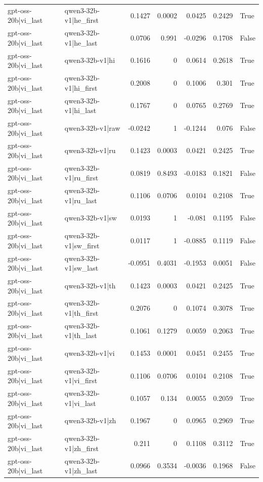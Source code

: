 \begin{table}
\begin{tabular}{l l r r r r l}
gpt-oss-20b|vi_last & qwen3-32b-v1|he_first & 0.1427 & 0.0002 & 0.0425 & 0.2429 & True \\
gpt-oss-20b|vi_last & qwen3-32b-v1|he_last & 0.0706 & 0.991 & -0.0296 & 0.1708 & False \\
gpt-oss-20b|vi_last & qwen3-32b-v1|hi & 0.1616 & 0 & 0.0614 & 0.2618 & True \\
gpt-oss-20b|vi_last & qwen3-32b-v1|hi_first & 0.2008 & 0 & 0.1006 & 0.301 & True \\
gpt-oss-20b|vi_last & qwen3-32b-v1|hi_last & 0.1767 & 0 & 0.0765 & 0.2769 & True \\
gpt-oss-20b|vi_last & qwen3-32b-v1|raw & -0.0242 & 1 & -0.1244 & 0.076 & False \\
gpt-oss-20b|vi_last & qwen3-32b-v1|ru & 0.1423 & 0.0003 & 0.0421 & 0.2425 & True \\
gpt-oss-20b|vi_last & qwen3-32b-v1|ru_first & 0.0819 & 0.8493 & -0.0183 & 0.1821 & False \\
gpt-oss-20b|vi_last & qwen3-32b-v1|ru_last & 0.1106 & 0.0706 & 0.0104 & 0.2108 & True \\
gpt-oss-20b|vi_last & qwen3-32b-v1|sw & 0.0193 & 1 & -0.081 & 0.1195 & False \\
gpt-oss-20b|vi_last & qwen3-32b-v1|sw_first & 0.0117 & 1 & -0.0885 & 0.1119 & False \\
gpt-oss-20b|vi_last & qwen3-32b-v1|sw_last & -0.0951 & 0.4031 & -0.1953 & 0.0051 & False \\
gpt-oss-20b|vi_last & qwen3-32b-v1|th & 0.1423 & 0.0003 & 0.0421 & 0.2425 & True \\
gpt-oss-20b|vi_last & qwen3-32b-v1|th_first & 0.2076 & 0 & 0.1074 & 0.3078 & True \\
gpt-oss-20b|vi_last & qwen3-32b-v1|th_last & 0.1061 & 0.1279 & 0.0059 & 0.2063 & True \\
gpt-oss-20b|vi_last & qwen3-32b-v1|vi & 0.1453 & 0.0001 & 0.0451 & 0.2455 & True \\
gpt-oss-20b|vi_last & qwen3-32b-v1|vi_first & 0.1106 & 0.0706 & 0.0104 & 0.2108 & True \\
gpt-oss-20b|vi_last & qwen3-32b-v1|vi_last & 0.1057 & 0.134 & 0.0055 & 0.2059 & True \\
gpt-oss-20b|vi_last & qwen3-32b-v1|zh & 0.1967 & 0 & 0.0965 & 0.2969 & True \\
gpt-oss-20b|vi_last & qwen3-32b-v1|zh_first & 0.211 & 0 & 0.1108 & 0.3112 & True \\
gpt-oss-20b|vi_last & qwen3-32b-v1|zh_last & 0.0966 & 0.3534 & -0.0036 & 0.1968 & False \\

\end{tabular}
\end{table}
